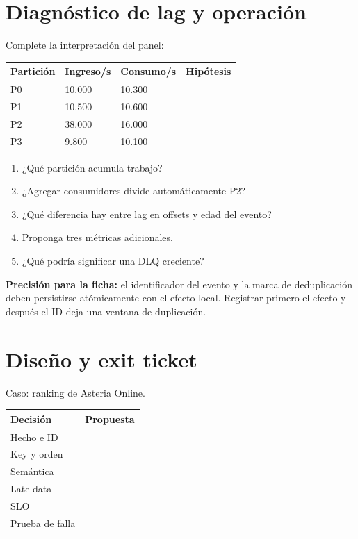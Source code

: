 \documentclass[variant=guia,cover=institutional,mode=print]{ua-engineering-v6-article}
\begin{document}
\newpage
\section{Diagnóstico de lag y operación}

Complete la interpretación del panel:

\begin{center}
\begin{tabular}{p{}p{}p{}p{}}
\toprule
Partición & Ingreso/s & Consumo/s & Hipótesis \\
\midrule
P0 & 10.000 & 10.300 & \rule{0pt}{0.9cm} \\
P1 & 10.500 & 10.600 & \rule{0pt}{0.9cm} \\
P2 & 38.000 & 16.000 & \rule{0pt}{0.9cm} \\
P3 & 9.800 & 10.100 & \rule{0pt}{0.9cm} \\
\bottomrule
\end{tabular}
\end{center}

\begin{enumerate}
\item ¿Qué partición acumula trabajo? \hrulefill
\item ¿Agregar consumidores divide automáticamente P2? \hrulefill
\item ¿Qué diferencia hay entre lag en offsets y edad del evento? \vspace{0.7cm}
\item Proponga tres métricas adicionales. \vspace{0.8cm}
\item ¿Qué podría significar una DLQ creciente? \vspace{0.8cm}
\end{enumerate}

\newpage

\begin{uainfo}
\textbf{Precisión para la ficha:} el identificador del evento y la marca de deduplicación deben persistirse atómicamente con el efecto local. Registrar primero el efecto y después el ID deja una ventana de duplicación.
\end{uainfo}

\section{Diseño y exit ticket}
Caso: ranking de Asteria Online.

\begin{tabular}{p{}p{}}
\toprule
Decisión & Propuesta \\
\midrule
Hecho e ID & \rule{0pt}{0.9cm} \\
Key y orden & \rule{0pt}{0.9cm} \\
Semántica & \rule{0pt}{0.9cm} \\
Late data & \rule{0pt}{0.9cm} \\
SLO & \rule{0pt}{0.9cm} \\
Prueba de falla & \rule{0pt}{0.9cm} \\
\bottomrule
\end{tabular}
\end{document}
